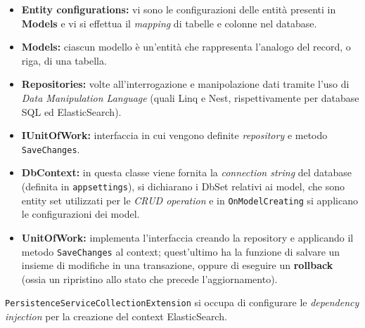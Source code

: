 \begin{itemize}
\item 
\textbf{Entity configurations:} vi sono le configurazioni delle entità presenti in \textbf{Models} e vi si effettua il \textit{mapping} di tabelle e colonne nel database.
\item
\textbf{Models:} ciascun modello è un'entità che rappresenta l'analogo del record, o riga, di una tabella.
\item 
\textbf{Repositories:} volte all'interrogazione e manipolazione dati tramite l'uso di \textit{Data Manipulation Language} (quali Linq e Nest, rispettivamente per database SQL ed ElasticSearch).
\item 
\textbf{IUnitOfWork:} interfaccia in cui vengono definite \textit{repository} e metodo \verb|SaveChanges|.
\item
\textbf{DbContext:} in questa classe viene fornita la \textit{connection string} del database (definita in \verb|appsettings|), si dichiarano i DbSet relativi ai model, che sono entity set utilizzati per le \textit{CRUD operation} \cite{DbSet} e in \verb|OnModelCreating| si applicano le configurazioni dei model.
\item 
\textbf{UnitOfWork:} implementa l'interfaccia creando la repository e applicando il metodo \verb|SaveChanges| al context; quest'ultimo ha la funzione di salvare un insieme di modifiche in una transazione, oppure di eseguire un \textbf{rollback} (ossia un ripristino allo stato che precede l'aggiornamento).
\end{itemize}
\verb|PersistenceServiceCollectionExtension| si occupa di configurare le \textit{dependency injection} per la creazione del context ElasticSearch.